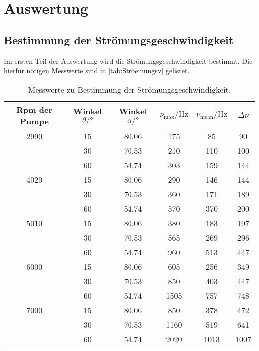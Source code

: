 \section{Auswertung}
\label{sec:Auswertung}



\subsection{Bestimmung der Strömungsgeschwindigkeit}
\label{sec:Strömungsv}
Im ersten Teil der Auswertung wird die Strömungsgeschwindigkeit bestimmt. Die hierfür nötigen Messwerte sind in \autoref{tab:Stroemungsv} gelistet.
\begin{table}
    \centering
    \caption{Messwerte zu Bestimmung der Strömungsgeschwindigkeit.}
    \begin{tabular}{c c c c c c}
        \toprule
        Rpm der Pumpe  & Winkel $\theta \mathrm{/} \unit{\degree}$ & Winkel $\alpha \mathrm{/}  \unit{\degree}$ & $\nu_{\text{max}} \mathrm{/} \unit{\hertz}$ & $\nu_{\text{mean}} \mathrm{/} \unit{\hertz}$ &  $ \Delta\nu$ \\
        \midrule
        2990 & 15 & 80.06 & 175 & 85 & 90  \\
             & 30 & 70.53 & 210 & 110 & 100 \\
             & 60 & 54.74 & 303 & 159 & 144 \\
        4020 & 15 & 80.06 & 290 & 146 & 144 \\
             & 30 & 70.53 & 360 & 171 & 189 \\
             & 60 & 54.74 & 570 & 370 & 200 \\
        5010 & 15 & 80.06 & 380 & 183 & 197 \\
             & 30 & 70.53 & 565 & 269 & 296 \\
             & 60 & 54.74 & 960 & 513 & 447 \\
        6000 & 15 & 80.06 & 605 & 256 & 349 \\
             & 30 & 70.53 & 850 & 403 & 447 \\
             & 60 & 54.74 & 1505 & 757 & 748 \\
        7000 & 15 & 80.06 & 850 & 378 & 472  \\
             & 30 & 70.53 & 1160 & 519 & 641 \\
             & 60 & 54.74 & 2020 & 1013 & 1007 \\
        \bottomrule
    \end{tabular}
    \label{tab:Stroemungsv}
\end{table}
